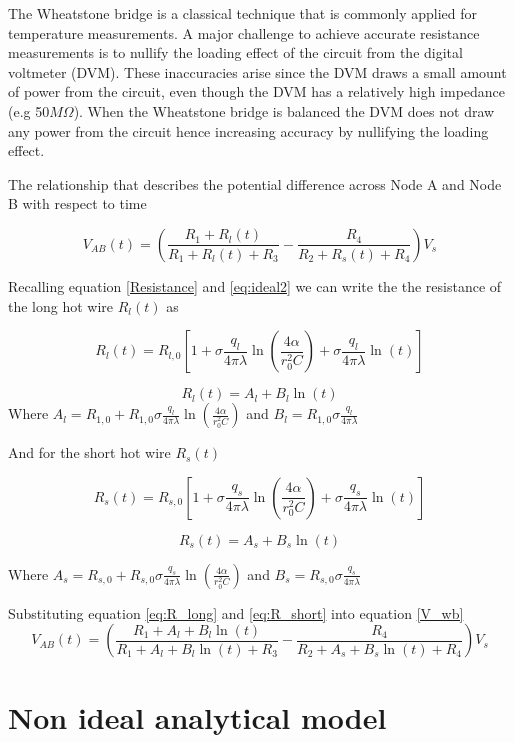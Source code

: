 \documentclass{article}
\begin{document}
The Wheatstone bridge is a classical technique that is commonly applied for temperature measurements. A major challenge to achieve accurate resistance measurements is to nullify the loading effect of the circuit from the digital voltmeter (DVM). These inaccuracies arise since the DVM draws a small amount of power from the circuit, even though the DVM has a relatively high impedance (e.g 50$M\Omega$). When the Wheatstone bridge is balanced the DVM does not draw any power from the circuit hence increasing accuracy by nullifying the loading effect. 

\vspace{3mm}

The relationship that describes the potential difference across Node A and Node B with respect to time  

	\begin{equation} \label{V_wb}
V_{AB}(t) = \left( \frac{R_1 + R_l(t)}{R_1 + R_l(t) + R_3} - \frac{R_4}{R_2 + R_s(t) + R_4} \right) V_{s}
	\end{equation}

Recalling equation \ref{Resistance} and \ref{eq:ideal2} we can write the the resistance of the long hot wire $R_l(t)$ as

$$R_l(t) = R_{l,0} \left[ 1 + \sigma \frac{q_l}{4 \pi \lambda} \ln \left( \frac{4 \alpha }		{r^2_0 C}\right) + \sigma \frac{q_l}{4 \pi \lambda} \ln \left( t \right) \right]$$

	\begin{equation} \label{eq:R_long}
	R_l(t) = A_l + B_l \ln (t)
	\end{equation}
Where $A_l = R_{1,0} + R_{1,0} \sigma \frac{q_l}{4 \pi \lambda} \ln \left( \frac{4 \alpha }		{r^2_0 C}\right)$ and $B_l = R_{1,0} \sigma \frac{q_l}{4 \pi \lambda}$


\vspace{3mm}

And for the short hot wire $R_s(t)$

$$R_s(t) = R_{s,0} \left[ 1 + \sigma \frac{q_s}{4 \pi \lambda} \ln \left( \frac{4 \alpha }		{r^2_0 C}\right) + \sigma \frac{q_s}{4 \pi \lambda} \ln \left( t \right) \right]$$
	
	\begin{equation} \label{eq:R_short}
	R_s(t) = A_s + B_s \ln (t)
	\end{equation}

Where $A_s = R_{s,0} + R_{s,0} \sigma \frac{q_s}{4 \pi \lambda} \ln \left( \frac{4 \alpha }		{r^2_0 C}\right)$ and $B_s = R_{s,0} \sigma \frac{q_s}{4 \pi \lambda}$

\vspace{3mm}

Substituting equation \ref{eq:R_long} and \ref{eq:R_short} into equation \ref{V_wb}
$$V_{AB}(t) = \left( \frac{R_1 + A_l + B_l \ln (t)}{R_1 + A_l + B_l \ln (t) + R_3} - \frac{R_4}{R_2 + A_s + B_s \ln (t) + R_4} \right) V_{s}$$

\newpage

\section{Non ideal analytical model}
\end{document}
